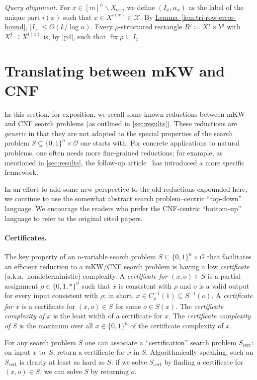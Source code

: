 \documentclass[11pt]{article}
\numberwithin{equation}{section}
\theoremstyle{definition}
\theoremstyle{plain}
\newcommand{\expref}[2]{\hyperref[#2]{#1~\ref{#2}}}
\DeclareMathOperator{\fix}{fix}
\DeclareMathOperator{\err}{err}
\DeclareMathOperator{\cert}{cert}
\newcommand{\calO}{\mathcal{O}}
\newcommand{\calX}{\mathcal{X}}
\newcommand{\allX}{[m]^n}
\begin{document}
\medskip
\noindent \emph{Query alignment.}
For $x \in \allX \smallsetminus X_{\err}$, we define $(I_x,\alpha_x)$ as the label of the unique part $i(x)$ such that $x\in X^{i(x)} \in\calX$. By \expref{Lemma}{lem:tri-row-error-bound}, $|I_x|\leq O(k/\log n)$. Every $\rho$-structured rectangle $R^j\coloneqq X^j\times Y^j$ with $X^j\supseteq X^{i(x)}$ is, by \ref{p4}, such that $\fix\rho\subseteq I_x$.


%
\section{Translating between mKW and CNF} \label{sec:apps}  %

In this section, for exposition, we recall some known reductions between mKW and CNF search problems (as outlined in \autoref{sec:results}). These reductions are \emph{generic} in that they are not adapted to the special properties of the search problem $S\subseteq\{0,1\}^n\times\calO$ one starts with. For concrete applications to natural problems, one often needs more fine-grained reductions; for example, as mentioned in \autoref{sec:results}, the follow-up
%
article~\cite{goos19monotone}   %
has introduced a more specific framework.

In an effort to add some new perspective to the old reductions expounded here, we continue to use the somewhat abstract search problem--centric ``top-down'' language. We encourage the readers who prefer the CNF-centric ``bottom-up'' language to refer to the original cited papers.

\paragraph{Certificates.}
The key property of an $n$-variable search problem $S\subseteq \{0,1\}^n\times\calO$ that facilitates an efficient reduction to a mKW/CNF search problem is having a low \emph{certificate} (a.k.a.\ nondeterministic) complexity. A \emph{certificate for $(x,o) \in S$} is a partial assignment $\rho\in\{0,1,*\}^n$ such that $x$ is consistent with $\rho$ and $o$ is a valid output for every input consistent with $\rho$; in short, $x\in C_\rho^{-1}(1)\subseteq S^{-1}(o)$. A \emph{certificate for $x$} is a certificate for $(x,o)\in S$ for some $o\in S(x)$. The \emph{certificate complexity of $x$} is the least width of a certificate for $x$. The \emph{certificate complexity of $S$} is the maximum over all $x\in\{0,1\}^n$ of the certificate complexity of $x$.

For any search problem $S$ one can associate a ``certification'' search problem $S_{\cert}$: on input $x$ to~$S$,
return %
a certificate for $x$ in $S$. Algorithmically speaking, such an $S_{\cert}$ is clearly at least as hard as $S$: if we solve $S_{\cert}$ by finding a certificate for $(x,o)\in S$, we can solve $S$ by
returning %
$o$.
\end{document}
